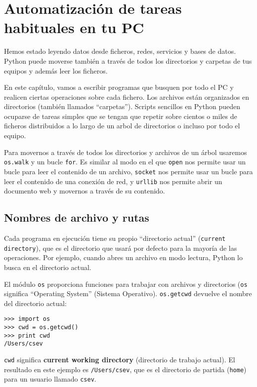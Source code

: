 
\chapter{Automatización de tareas habituales en tu PC}

Hemos estado leyendo datos desde ficheros, redes, servicios y
bases de datos. Python puede moverse también a través de todos los
directorios y carpetas de tus equipos y además leer
los ficheros.

En este capítulo, vamos a escribir programas que busquen
por todo el PC y
realicen ciertas operaciones sobre cada fichero.
Los archivos están organizados en directorios (también llamados ``carpetas'').
Scripts sencillos en Python
pueden ocuparse de tareas simples que se tengan que repetir
sobre cientos o miles de ficheros
distribuidos a lo largo de un arbol de directorios o incluso por todo el equipo.

Para movernos a través de todos los directorios y archivos de un árbol usaremos
{\tt os.walk} y un bucle {\tt for}. Es similar al modo en el que
{\tt open} nos permite usar un bucle para leer el contenido de un archivo,
{\tt socket} nos permite usar un bucle para leer el contenido de una conexión de red, y
{\tt urllib} nos permite abrir un documento web y movernos a través de su contenido. 

\section{Nombres de archivo y rutas}
\label{paths}


Cada programa en ejecución tiene su propio ``directorio actual'' ({\tt current directory}), que es el directorio que
usará por defecto para la mayoría de las operaciones. Por ejemplo, cuando abres un archivo
en modo lectura, Python lo busca en el directorio actual.


El módulo {\tt os} proporciona funciones para trabajar con archivos y
directorios ({\tt os} significa ``Operating System'' (Sistema Operativo).
{\tt os.getcwd} devuelve el nombre del directorio actual:


\beforeverb
\begin{verbatim}
>>> import os
>>> cwd = os.getcwd()
>>> print cwd
/Users/csev
\end{verbatim}
\afterverb
%
{\tt cwd} significa {\bf current working directory} (directorio de trabajo actual). El resultado en
este ejemplo es {\tt /Users/csev}, que es el directorio de partida ({\tt home}) para un
usuario llamado {\tt csev}.

